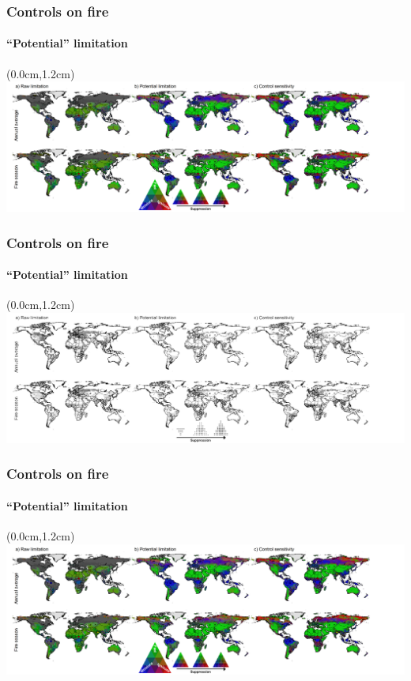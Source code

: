\addtocounter{framenumber}{-1}
\addtocounter{framenumber}{-1}

\begin{frame}
	\frametitle{Controls on fire}
	\framesubtitle{``Potential'' limitation}
	\begin{textblock*}{12cm}(0.0cm,1.2cm)
        \includegraphics[width=14cm,trim={0 0 7.5cm 0}, clip]{images/RawPotSen}	
	\end{textblock*}
\end{frame}

\addtocounter{framenumber}{-1}

\begin{frame}
	\frametitle{Controls on fire}
	\framesubtitle{``Potential'' limitation}
	\begin{textblock*}{12cm}(0.0cm,1.2cm)
        \includegraphics[width=14cm,trim={0 0 7.5cm 0}, clip]{images/RawPotSen-BW}	
	\end{textblock*}
\end{frame}

\addtocounter{framenumber}{-1}

\begin{frame}
	\frametitle{Controls on fire}
	\framesubtitle{``Potential'' limitation}
	\begin{textblock*}{12cm}(0.0cm,1.2cm)
        \includegraphics[width=14cm,trim={0 0 7.5cm 0}, clip]{images/RawPotSen}	
	\end{textblock*}
\end{frame}


